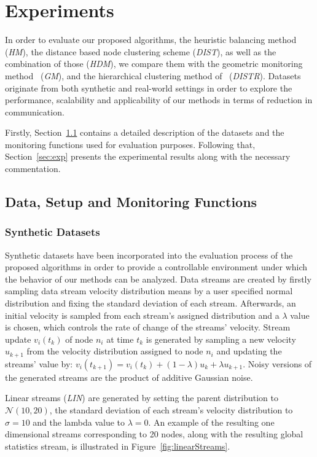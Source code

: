 \chapter{Experiments} \label{chap:exp}

In order to evaluate our proposed algorithms, the heuristic balancing method (\emph{HM}), the distance based node clustering scheme (\emph{DIST}), as well as the combination of those (\emph{HDM}), we compare them with the geometric monitoring method~\cite{Sharfman2006GM} (\emph{GM}), and the hierarchical clustering method of~\cite{Keren2014GMHetStreams} (\emph{DISTR}). Datasets originate from both synthetic and real-world settings in order to explore the performance, scalability and applicability of our methods in terms of reduction in communication.

Firstly, Section~\ref{sec:datasets} contains a detailed description of the datasets and the monitoring functions used for evaluation purposes. Following that, Section~\ref{sec:exp} presents the experimental results along with the necessary commentation.

\section{Data, Setup and Monitoring Functions} \label{sec:datasets}

\subsection{Synthetic Datasets}

Synthetic datasets have been incorporated into the evaluation process of the proposed algorithms in order to provide a controllable environment under which the behavior of our methods can be analyzed. Data streams are created by firstly sampling data stream velocity distribution means by a user specified normal distribution and fixing the standard deviation of each stream. Afterwards, an initial velocity is sampled from each stream's assigned distribution and a $\lambda$ value is chosen, which controls the rate of change of the streams' velocity. Stream update $v_i(t_k)$ of node $n_i$ at time $t_k$ is generated by sampling a new velocity $u_{k+1}$ from the velocity distribution assigned to node $n_i$ and updating the streams' value by: $v_i(t_{k+1})=v_i(t_k) + (1-\lambda)u_{k} + \lambda u_{k+1}$. Noisy versions of the generated streams are the product of additive Gaussian noise.

Linear streams (\emph{LIN}) are generated by setting the parent distribution to $\mathcal{N}(10,20)$, the standard deviation of each stream's velocity distribution to $\sigma=10$ and the lambda value to $\lambda=0$. An example of the resulting one dimensional streams corresponding to 20 nodes, along with the resulting global statistics stream, is illustrated in Figure~\ref{fig:linearStreams}.

